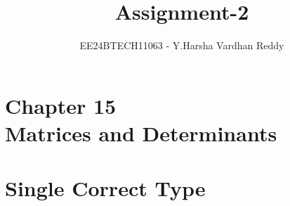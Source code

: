 \documentclass[journal,,12pt,twocolumn]{IEEEtran}
\theoremstyle{remark}
\begin{document}

\vspace{3cm}

\title{Assignment-2}
\author{EE24BTECH11063 - Y.Harsha Vardhan Reddy}
\maketitle
\newpage
\bigskip

\renewcommand{\thefigure}{\theenumi}
\renewcommand{\thetable}{\theenumi}
\section*{Chapter 15\\Matrices and Determinants}
\section*{Single Correct Type}
\end{document}
